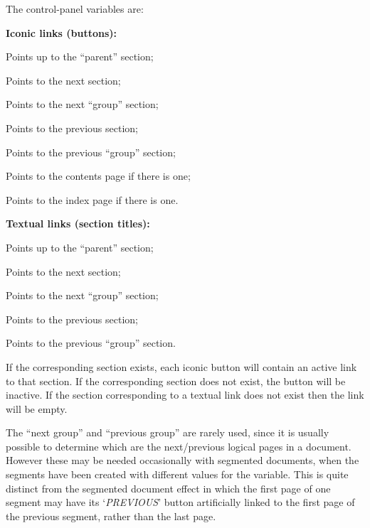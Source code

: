 \medskip\noindent
The control-panel variables are:\nobreak

\medskip\nobreak
{}%
\html{\\}
\noindent
\textbf{Iconic links (buttons):}
\begin{htmllist}\addtolength{\leftskip}{15pt}%
\item [\fn{\$UP}]  Points up to the ``parent'' section;
\item [\fn{\$NEXT}] Points to the next section;
\item [\fn{\$NEXT\_GROUP}] Points to the next ``group'' section;
\item [\fn{\$PREVIOUS}] Points to the previous section;
\item [\fn{\$PREVIOUS\_GROUP}] Points to the previous ``group'' section;
\item [\fn{\$CONTENTS}] Points to the contents page if there is one;
\item [\fn{\$INDEX}] Points to the index page if there is one.
\end{htmllist}

%
\html{\\}\noindent
\textbf{Textual links (section titles):}
\begin{htmllist}\latex{\addtolength{\leftskip}{15pt}}%
\item [\fn{\$UP\_TITLE}]  Points up to the ``parent'' section;
\item [\fn{\$NEXT\_TITLE}] Points to the next section;
\item [\fn{\$NEXT\_GROUP\_TITLE}] Points to the next ``group'' section;
\item [\fn{\$PREVIOUS\_TITLE}] Points to the previous section;
\item [\fn{\$PREVIOUS\_GROUP\_TITLE}] Points to the previous ``group'' section.
\end{htmllist}
If the corresponding section exists, each iconic button will contain an
active link to that section. If the corresponding section does
not exist, the button will be inactive. If the section corresponding
to a textual link does not exist then the link will be empty.

The ``next group'' and ``previous group'' are rarely used,
since it is usually possible to determine
which are the next/previous logical pages in a document.
However these may be needed occasionally with segmented documents,
when the segments have been created with different values
for the  variable.
This is quite distinct from the segmented document effect
in which the first page of one segment may have its `\emph{PREVIOUS}'
button artificially linked to the first page of the previous segment,
rather than the last page.


